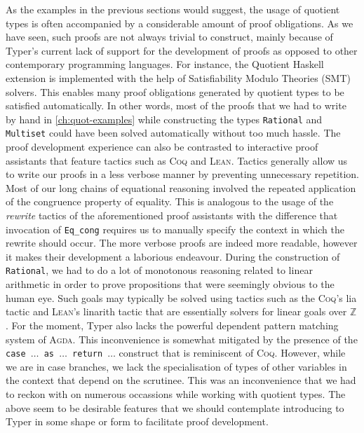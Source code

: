 \documentclass[12pt,twoside,maitrise]{dms}
\theoremstyle{definition}
\numberwithin{equation}{section}
\numberwithin{table}{chapter}
\numberwithin{figure}{chapter}
\newcommand\kw[1] {\textsf{#1}}
\newcommand\id[1] {\texttt{#1}}
\newcommand\fn[1] {\texttt{#1}}
\def\Coq{\textsc{Coq}\xspace}
\def\Agda{\textsc{Agda}\xspace}
\def\Lean{\textsc{Lean}\xspace}
\begin{document}
As the examples in the previous sections would suggest, the usage of quotient
types is often accompanied by a considerable amount of proof obligations. As we
have seen, such proofs are not always trivial to construct, mainly because of
Typer's current lack of support for the development of proofs as opposed to
other contemporary programming languages. For instance, the Quotient Haskell
extension\cite{hewer2023quotient} is implemented with the help of Satisfiability
Modulo Theories (SMT) solvers. This enables many proof obligations generated by
quotient types to be satisfied automatically. In other words, most of the proofs
that we had to write by hand in \autoref{ch:quot-examples} while constructing
the types \id{Rational} and \id{Multiset} could have been solved automatically
without too much hassle. The proof development experience can also be contrasted
to interactive proof assistants that feature tactics such as \Coq{} and \Lean{}.
Tactics generally allow us to write our proofs in a less verbose manner by
preventing unnecessary repetition. Most of our long chains of equational
reasoning involved the repeated application of the congruence property of
equality. This is analogous to the usage of the \emph{rewrite} tactics of the
aforementioned proof assistants with the difference that invocation of
\id{Eq\_cong} requires us to manually specify the context in which the rewrite
should occur. The more verbose proofs are indeed more readable, however it makes
their development a laborious endeavour. During the construction of
\id{Rational}, we had to do a lot of monotonous reasoning related to linear
arithmetic in order to prove propositions that were seemingly obvious to the
human eye. Such goals may typically be solved using tactics such as the \Coq{}'s
\kw{lia} tactic and \Lean{}'s \kw{linarith} tactic that are essentially solvers
for linear goals over $\mathbb{Z}$. For the moment, Typer also lacks the
powerful dependent pattern matching system of \Agda{}. This inconvenience is
somewhat mitigated by the presence of the \fn{\kw{case} $\ldots$ \kw{as}
  $\ldots$ \kw{return} $\ldots$} construct that is reminiscent of \Coq{}.
However, while we are in \kw{case} branches, we lack the specialisation of types
of other variables in the context that depend on the scrutinee. This was an
inconvenience that we had to reckon with on numerous occassions while working
with quotient types. The above seem to be desirable features that we should
contemplate introducing to Typer in some shape or form to facilitate proof
development.
\end{document}

